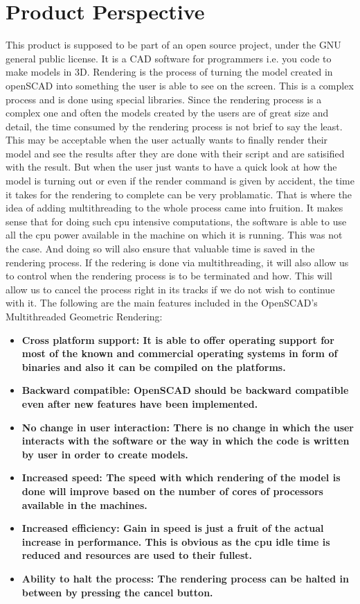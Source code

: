\section{Product Perspective}
This product is supposed to be part of an open source project, under the GNU general public license. It is a CAD software for programmers i.e. you code to make models in 3D. Rendering is the process of turning the model created in openSCAD into something the user is able to see on the screen. This is a complex process and is done using special libraries. Since the rendering process is a complex one and often the models created by the users are of great size and detail, the time consumed by the rendering process is not brief to say the least.
This may be acceptable when the user actually wants to finally render their model and see the results after they are done with their script and are satisified with the result. But when the user just wants to have a quick look at how the model is turning out or even if the render command is given by accident, the time it takes for the rendering to complete can be very problamatic.
That is where the idea of adding multithreading to the whole process came into fruition. It makes sense that for doing such cpu intensive computations, the software is able to use all the cpu power available in the machine on which it is running. This was not the case. And doing so will also ensure that valuable time is saved in the rendering process. If the redering is done via multithreading, it will also allow us to control when the rendering process is to be terminated and how. This will allow us to cancel the process right in its tracks if we do not wish to continue with it.
The following are the main features included in the OpenSCAD's Multithreaded Geometric Rendering:
\begin{itemize}
	\item \bf{Cross platform support}: It is able to offer operating support for most of the known and commercial operating systems in form of binaries and also it can be compiled on the platforms.
	\item \bf{Backward compatible}: OpenSCAD should be backward compatible even after new features have been implemented.
	\item \bf{No change in user interaction}: There is no change in which the user interacts with the software or the way in which the code is written by user in order to create models.
	\item \bf{Increased speed}: The speed with which rendering of the model is done will improve based on the number of cores of processors available in the machines.
	\item \bf{Increased efficiency}: Gain in speed is just a fruit of the actual increase in performance. This is obvious as the cpu idle time is reduced and resources are used to their fullest.
	\item \bf{Ability to halt the process}: The rendering process can be halted in between by pressing the cancel button.
\end{itemize}
